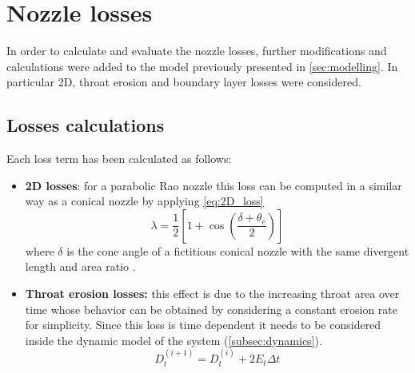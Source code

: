 \section{Nozzle losses}
\label{sec:nozzle_losses}

In order to calculate and evaluate the nozzle losses, further modifications and calculations were added to the model previously presented in \autoref{sec:modelling}.
In particular 2D, throat erosion and boundary layer losses were considered.

\subsection{Losses calculations}  

Each loss term has been calculated as follows:
\begin{itemize}
    \item \textbf{2D losses}: for a parabolic Rao nozzle this loss can be computed in a similar way as a conical nozzle by applying \autoref{eq:2D_loss}
    \begin{equation}
        \lambda = \frac{1}{2} \left[ 1 + \cos \left( \frac{\delta + \theta_e}{2}\right)\right]
        \label{eq:2D_loss}
    \end{equation}
    where $\delta$ is the cone angle of a fictitious conical nozzle with the same divergent length and area ratio \cite{sutton}.
    \item \textbf{Throat erosion losses:} this effect is due to the increasing throat area over time whose behavior can be obtained by considering a constant erosion rate for simplicity. Since this loss is time dependent it needs to be considered inside the dynamic model of the system (\autoref{subsec:dynamics}).
    \begin{equation}
        D_t^{(i+1)} = D_t^{(i)} + 2 E_t \Delta t
    \end{equation}


\end{itemize}
